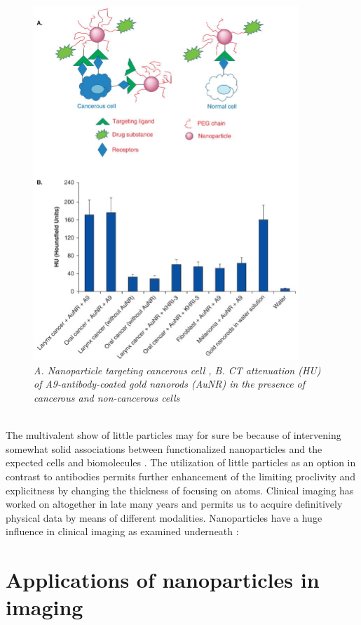 \documentclass[12pt]{article}
\begin{document}
\begin{figure}[htp]
    \centering
    \includegraphics[width=10cm]{1.jpg}
    \caption{\textit{A. Nanoparticle targeting cancerous cell ,  B. CT attenuation (HU) of A9-antibody-coated gold nanorods (AuNR) in the presence of cancerous and non-cancerous cells}}
    \label{Fig:2}
\end{figure}
\\
The multivalent show of little particles may for sure be because of intervening somewhat solid associations between functionalized nanoparticles and the expected cells and biomolecules . The utilization of little particles as an option in contrast to antibodies permits further enhancement of the limiting proclivity and explicitness by changing the thickness of focusing on atoms. Clinical imaging has worked on altogether in late many years and permits us to acquire definitively physical data by means of different modalities. Nanoparticles have a huge influence in clinical imaging as examined underneath :

\section*{Applications of nanoparticles in imaging }
\end{document}
